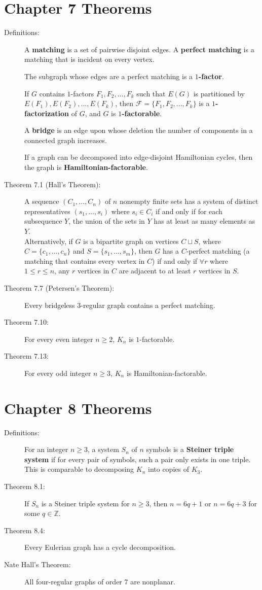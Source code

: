 \documentclass[9pt]{extarticle}
\newcommand{\Z}{\mathbb{Z}}
\begin{document}
  \section*{Chapter 7 Theorems}%
  \begin{description}
    \item[Definitions:] A \textbf{matching} is a set of pairwise disjoint edges. A \textbf{perfect matching} is a matching that is incident on every vertex.

      The subgraph whose edges are a perfect matching is a $1$\textbf{-factor}.

      If $G$ contains $1$-factors $F_1,F_2,\dots,F_k$ such that $E(G)$ is partitioned by $E(F_1),E(F_2),\dots,E(F_k)$, then $\mathcal{F} = \{F_1,F_2,\dots,F_k\}$ is a $1$\textbf{-factorization} of $G$, and $G$ is $1$\textbf{-factorable}.

      A \textbf{bridge} is an edge upon whose deletion the number of components in a connected graph increases.

      If a graph can be decomposed into edge-disjoint Hamiltonian cycles, then the graph is \textbf{Hamiltonian-factorable}.
    \item[Theorem 7.1 (Hall's Theorem):] A sequence $(C_1,\dots,C_n)$ of $n$ nonempty finite sets has a system of distinct representatives $(s_1,\dots,s_i)$ where $s_i\in C_i$ if and only if for each subsequence $Y$, the union of the sets in $Y$ has at least as many elements as $Y$.\\

      Alternatively, if $G$ is a bipartite graph on vertices $C\sqcup S$, where $C = \{c_1,\dots,c_n\}$ and $S = \{s_1,\dots,s_m\}$, then $G$ has a $C$-perfect matching (a matching that contains every vertex in $C$) if and only if $\forall r$ where $1 \leq r \leq n$, any $r$ vertices in $C$ are adjacent to at least $r$ vertices in $S$.
    \item[Theorem 7.7 (Petersen's Theorem):] Every bridgeless $3$-regular graph contains a perfect matching.
    \item[Theorem 7.10:] For every even integer $n\geq 2$, $K_n$ is $1$-factorable.
    \item[Theorem 7.13:] For every odd integer $n\geq 3$, $K_n$ is Hamiltonian-factorable.
  \end{description}
  \section*{Chapter 8 Theorems}%
  \begin{description}
    \item[Definitions:] For an integer $n\geq 3$, a system $S_n$ of $n$ symbols is a \textbf{Steiner triple system} if for every pair of symbols, such a pair only exists in one triple. This is comparable to decomposing $K_n$ into copies of $K_3$.
    \item[Theorem 8.1:] If $S_n$ is a Steiner triple system for $n\geq 3$, then $n = 6q + 1$ or $n = 6q + 3$ for some $q\in \Z$.
    \item[Theorem 8.4:] Every Eulerian graph has a cycle decomposition.
    \item[Nate Hall's Theorem:] All four-regular graphs of order 7 are nonplanar.
  \end{description}
\end{document}
